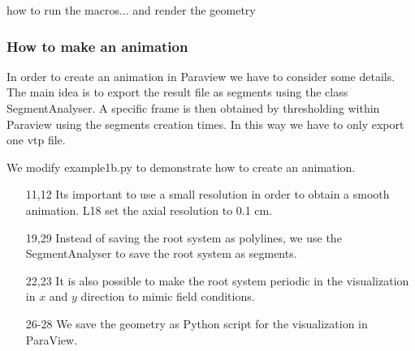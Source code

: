how to run the macros... and render the geometry


\subsubsection*{How to make an animation} \label{ssec:animation}

In order to create an animation in Paraview we have to consider some details. The main idea is to export the result file as segments using the class SegmentAnalyser. A specific frame is then obtained by thresholding within Paraview using the segments creation times. In this way we have to only export one vtp file. 

We modify example1b.py to demonstrate how to create an animation.

 

\begin{itemize}

\item[11,12] Its important to use a small resolution in order to obtain a smooth animation. L18 set the axial resolution to 0.1 cm. 

\item[19,29] Instead of saving the root system as polylines, we use the SegmentAnalyser to save the root system as segments.

\item[22,23] It is also possible to make the root system periodic in the visualization in $x$ and $y$ direction to mimic field conditions.

\item[26-28] We save the geometry as Python script for the visualization in ParaView.

\end{itemize}


